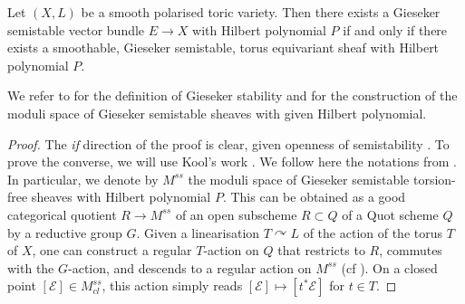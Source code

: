 \documentclass[a4paper,10pt]{amsart}
\theoremstyle{plain}{
    \newtheorem{theorem}{Theorem}[section]
    \newtheorem{lemma}[theorem]{Lemma}
    \newtheorem{corollary}[theorem]{Corollary}
    \newtheorem{proposition}[theorem]{Proposition}
    \newtheorem{conjecture}[theorem]{Conjecture}
}
\theoremstyle{definition}{
    \newtheorem{definition}[theorem]{Definition}
    \newtheorem{defn-thm}[theorem]{Definition-Theorem}
    \newtheorem{example}[theorem]{Example}
    \newtheorem{notation}[theorem]{Notation}
}
\theoremstyle{remark}{
    \newtheorem{remark}[theorem]{Remark}
    \newtheorem{problem}[theorem]{Problem}
    \newtheorem{question}[theorem]{Question}
}
\def\cE{\mathcal{E}}
\begin{document}
\begin{proposition}
 \label{prop:reduction to smoothable toric sheaves general}
 Let $(X,L)$ be a smooth polarised toric variety. Then there exists a Gieseker semistable vector bundle $E\to X$ with Hilbert polynomial $P$ if and only if there exists a smoothable, Gieseker semistable, torus equivariant sheaf with Hilbert polynomial $P$.
\end{proposition}
We refer to \cite[Chapters 1, 2 and 4]{HuLe} for the definition of Gieseker stability and for the construction of the moduli space of Gieseker semistable sheaves with given Hilbert polynomial.
\begin{proof}
The {\it if} direction of the proof is clear, given openness of semistability \cite[Proposition 2.3.1]{HuLe}. To prove the converse, we will use Kool's work \cite{Koo11}. We follow here the notations from \cite[Section 4]{Koo11}. In particular, we denote by $M^{ss}$ the moduli space of Gieseker semistable torsion-free sheaves with Hilbert polynomial $P$. This can be obtained as a good categorical quotient $R\to M^{ss}$ of an open subscheme $R\subset Q$ of a Quot scheme $Q$ by a reductive group $G$. Given a linearisation $T\curvearrowright L$ of the action of the torus $T$ of $X$, one can construct a regular $T$-action on $Q$ that restricts to $R$, commutes with the $G$-action, and descends to a regular action on $M^{ss}$ (cf \cite[Proposition 4.1]{Koo11}). On a closed point $[\cE]\in M^{ss}_{cl}$, this action simply reads $[ \cE]\mapsto [t^*\cE]$ for $t\in T$.


\end{proof}
\end{document}
